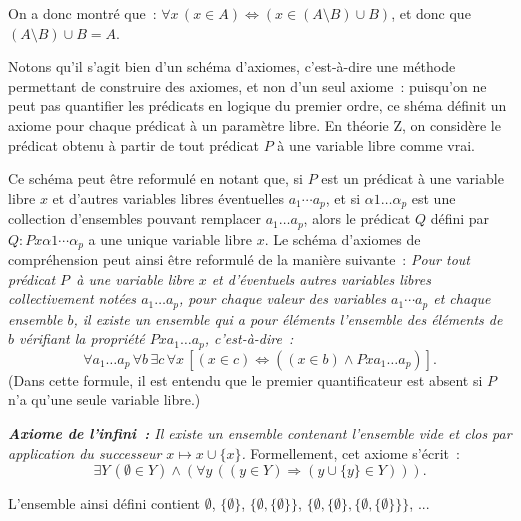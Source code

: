     On a donc montré que : $\forall x \, (x \in A) \Leftrightarrow (x \in (A \setminus B) \cup B)$, et donc que $(A \setminus B) \cup B = A$.

    \done

\medskip

Notons qu'il s'agit bien d'un schéma d'axiomes, c'est-à-dire une méthode permettant de construire des axiomes, et non d'un seul axiome : puisqu'on ne peut pas quantifier les prédicats en logique du premier ordre, ce shéma définit un axiome pour chaque prédicat à un paramètre libre. 
En théorie Z, on considère le prédicat obtenu à partir de tout prédicat $P$ à une variable libre comme vrai.

Ce schéma peut être reformulé en notant que, si $P$ est un prédicat à une variable libre $x$ et d'autres variables libres éventuelles $a_1 \cdots a_p$, et si $\alpha 1 \dots \alpha_p$ est une collection d'ensembles pouvant remplacer $a_1 \dots a_p$, alors le prédicat $Q$ défini par $Q: P x \alpha1 \cdots \alpha_p$ a une unique variable libre $x$. 
Le schéma d'axiomes de compréhension peut ainsi être reformulé de la manière suivante : 
\textit{Pour tout prédicat $P$ à une variable libre $x$ et d'éventuels autres variables libres collectivement notées $a_1 \dots a_p$, pour chaque valeur des variables $a_1 \cdots a_p$ et chaque ensemble $b$, il existe un ensemble qui a pour éléments l'ensemble des éléments de $b$ vérifiant la propriété $P x a_1 \dots a_p$, c'est-à-dire :}
\begin{equation*}
\forall a_1 \dots a_p \, \forall b \, \exists c \, \forall x \, [ (x \in c) \Leftrightarrow ((x \in b) \wedge P x a_1 \dots a_p)]. 
\end{equation*}
(Dans cette formule, il est entendu que le premier quantificateur est absent si $P$ n'a qu'une seule variable libre.) 

\medskip

\noindent\textit{\textbf{Axiome de l'infini :} Il existe un ensemble contenant l'ensemble vide et clos par application du successeur $x \mapsto x \cup \lbrace x \rbrace$.} Formellement, cet axiome s'écrit : 
\begin{equation*}
    \exists Y \, (\emptyset \in Y) \wedge (\forall y \, ((y \in Y) \Rightarrow (y \cup \lbrace y \rbrace \in Y))). 
\end{equation*}

\medskip

L'ensemble ainsi défini contient $\emptyset$, $\lbrace \emptyset \rbrace$, $\lbrace \emptyset, \lbrace \emptyset \rbrace \rbrace$, $\lbrace \emptyset, \lbrace \emptyset \rbrace, \lbrace \emptyset, \lbrace \emptyset \rbrace \rbrace \rbrace$, ...

